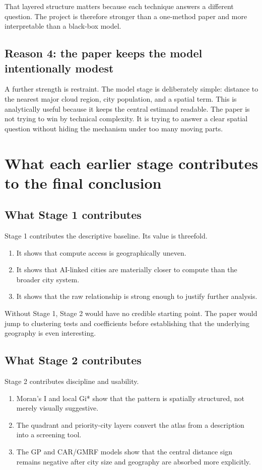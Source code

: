 \documentclass[11pt]{article}
\begin{document}
That layered structure matters because each technique answers a different question. The project is therefore stronger than a one-method paper and more interpretable than a black-box model.

\subsection{Reason 4: the paper keeps the model intentionally modest}
A further strength is restraint. The model stage is deliberately simple: distance to the nearest major cloud region, city population, and a spatial term. This is analytically useful because it keeps the central estimand readable. The paper is not trying to win by technical complexity. It is trying to answer a clear spatial question without hiding the mechanism under too many moving parts.

\section{What each earlier stage contributes to the final conclusion}
\subsection{What Stage 1 contributes}
Stage 1 contributes the descriptive baseline. Its value is threefold.
\begin{enumerate}[leftmargin=*]
    \item It shows that compute access is geographically uneven.
    \item It shows that AI-linked cities are materially closer to compute than the broader city system.
    \item It shows that the raw relationship is strong enough to justify further analysis.
\end{enumerate}

Without Stage 1, Stage 2 would have no credible starting point. The paper would jump to clustering tests and coefficients before establishing that the underlying geography is even interesting.

\subsection{What Stage 2 contributes}
Stage 2 contributes discipline and usability.
\begin{enumerate}[leftmargin=*]
    \item Moran's I and local Gi* show that the pattern is spatially structured, not merely visually suggestive.
    \item The quadrant and priority-city layers convert the atlas from a description into a screening tool.
    \item The GP and CAR/GMRF models show that the central distance sign remains negative after city size and geography are absorbed more explicitly.
\end{enumerate}
\end{document}
